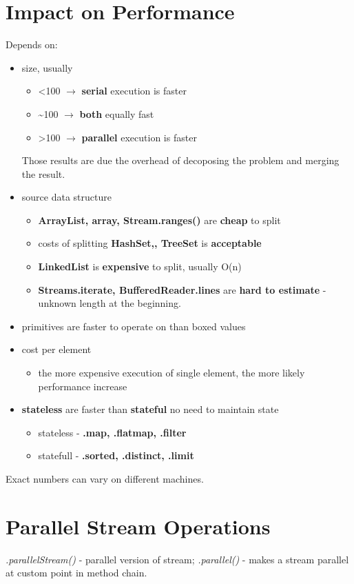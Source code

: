 \documentclass{report}
\begin{document}
\section{Impact on Performance}
Depends on:
\begin{itemize}
	\item size, usually
	\begin{itemize}
		\item \textless  100 $\rightarrow$ \textbf{serial} execution is faster
		\item \sim100 $ \rightarrow$ \textbf{both} equally fast
		\item \textgreater 100 $\rightarrow$ \textbf{parallel}  execution is faster
		\end{itemize}
	Those results are due the overhead of decoposing the problem and merging the result.
	\item source data structure
	\begin{itemize}
		\item \textbf{ArrayList, array, Stream.ranges()} are \textbf{cheap} to split
		\item costs of splitting \textbf{HashSet,, TreeSet} is \textbf{acceptable}
		\item \textbf{LinkedList} is \textbf{expensive} to split, usually O(n)
		\item \textbf{Streams.iterate, BufferedReader.lines} are \textbf{hard to estimate} - unknown length at the beginning.
	\end{itemize}
	\item primitives are faster to operate on than boxed values
	\item cost per element
	\begin{itemize}
		\item the more expensive execution of single element, the more likely performance increase
	\end{itemize}
    \item \textbf{stateless} are faster than \textbf{stateful} no need to maintain state
    \begin{itemize}
    	\item stateless - \textbf{.map, .flatmap, .filter}
    	\item statefull - \textbf{.sorted, .distinct, .limit}
    \end{itemize}
\end{itemize}
Exact numbers can vary on different machines.

\section{Parallel Stream Operations}
\textit{.parallelStream()} - parallel version of stream;
\textit{.parallel()} - makes a stream parallel at custom point in method chain.
\end{document}
